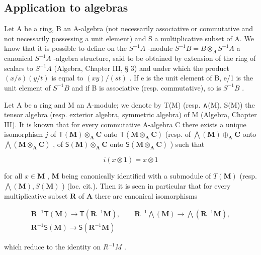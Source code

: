 \subsection{Application to algebras}

Let A be a ring, B an A-algebra (not necessarily associative or commutative and not necessarily possessing a unit element) and S a multiplicative subset of A. We know that it is possible to define on the \(S^{-1}A\) -module \(S^{-1}B = B \otimes_{A} S^{-1}A\) a canonical \(S^{-1}A\) -algebra structure, said to be obtained by extension of the ring of scalars to \(S^{-1}A\) (Algebra, Chapter III, § 3) and under which the product \((x/s)(y/t)\) is equal to \((xy)/(st)\) . If e is the unit element of B, e/1 is the unit element of \(S^{-1}B\) and if B is associative (resp. commutative), so is \(S^{-1}B\) .

Let A be a ring and M an A-module; we denote by T(M) (resp. ∧(M), S(M)) the tensor algebra (resp. exterior algebra, symmetric algebra) of M (Algebra, Chapter III). It is known that for every commutative A-algebra C there exists a unique isomorphism \(j\) of \(\mathsf{T}(\mathbf{M}) \otimes_{\mathbf{A}} \mathbf{C}\) onto \(\mathsf{T}(\mathbf{M} \otimes_{\mathbf{A}} \mathbf{C})\) (resp. of \(\bigwedge (\mathbf{M}) \oplus_{\mathbf{A}} \mathbf{C}\) onto \(\bigwedge (\mathbf{M} \otimes_{\mathbf{A}} \mathbf{C})\) , of \(\mathsf{S}(\mathbf{M}) \otimes_{\mathbf{A}} \mathbf{C}\) onto \(\mathsf{S}(\mathbf{M} \otimes_{\mathbf{A}} \mathbf{C})\) ) such that

\[
i (x \otimes 1) = x \otimes 1
\]

for all \(x \in \mathbf{M}\) , \(\mathbf{M}\) being canonically identified with a submodule of \(T(\mathbf{M})\) (resp. \(\bigwedge (\mathbf{M}), S(\mathbf{M})\) ) (loc. cit.). Then it is seen in particular that for every multiplicative subset \(\mathbf{R}\) of \(\mathbf{A}\) there are canonical isomorphisms

\[
\begin{array}{c} \mathbf {R} ^ {- 1} \mathsf {T} (\mathbf {M}) \to \mathsf {T} (\mathbf {R} ^ {- 1} \mathbf {M}), \qquad \mathbf {R} ^ {- 1} \bigwedge (\mathbf {M}) \to \bigwedge (\mathbf {R} ^ {- 1} \mathbf {M}), \\ \mathbf {R} ^ {- 1} \mathsf {S} (\mathbf {M}) \to \mathsf {S} (\mathbf {R} ^ {- 1} \mathbf {M}) \end{array}
\]

which reduce to the identity on \(R^{-1}M\) .

